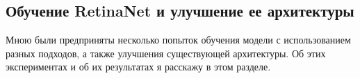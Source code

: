 \subsection{Обучение RetinaNet и улучшение ее архитектуры}\label{sect-6}

Мною были предприняты несколько попыток обучения модели с использованием разных подходов, а также улучшения существующей архитектуры. Об этих экспериментах и об их результатах я расскажу в этом разделе.




